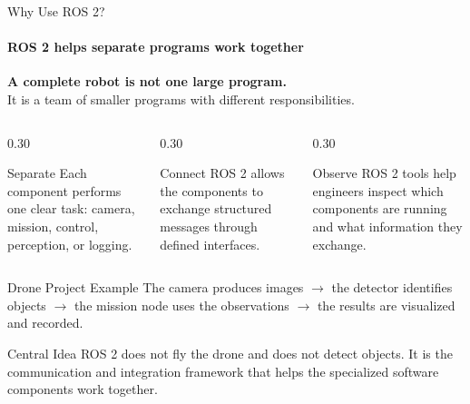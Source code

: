\begin{frame}{Why Use ROS 2?}
\framesubtitle{ROS 2 helps separate programs work together}

\footnotesize

\begin{center}
    \textbf{A complete robot is not one large program.}\\[0.2em]
    It is a team of smaller programs with different responsibilities.
\end{center}

\pause

\begin{columns}[T,onlytextwidth]
    \begin{column}{0.30\textwidth}
        \begin{block}{Separate}
            Each component performs one clear task:
            camera, mission, control, perception, or logging.
        \end{block}
    \end{column}
    \hfill
    \begin{column}{0.30\textwidth}
        \begin{block}{Connect}
            ROS 2 allows the components to exchange structured messages
            through defined interfaces.
        \end{block}
    \end{column}
    \hfill
    \begin{column}{0.30\textwidth}
        \begin{block}{Observe}
            ROS 2 tools help engineers inspect which components are
            running and what information they exchange.
        \end{block}
    \end{column}
\end{columns}

\pause

\begin{exampleblock}{Drone Project Example}
    The camera produces images
    \(\rightarrow\)
    the detector identifies objects
    \(\rightarrow\)
    the mission node uses the observations
    \(\rightarrow\)
    the results are visualized and recorded.
\end{exampleblock}

\begin{alertblock}{Central Idea}
    ROS 2 does not fly the drone and does not detect objects.
    It is the communication and integration framework that helps
    the specialized software components work together.
\end{alertblock}

\end{frame}



